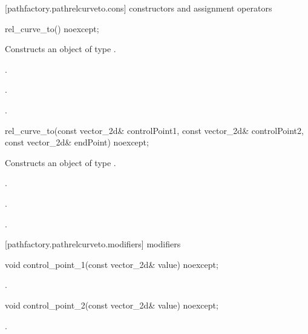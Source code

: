  [pathfactory.pathrelcurveto.cons] { constructors and assignment operators}

\begin{itemdecl}
    rel_curve_to() noexcept;
\end{itemdecl}
\begin{itemdescr}
	\pnum
	\effects
	Constructs an object of type .
	
	\pnum
	\postconditions
	.

	.

	.
\end{itemdescr}

\begin{itemdecl}
    rel_curve_to(const vector_2d& controlPoint1, const vector_2d& controlPoint2,
      const vector_2d& endPoint) noexcept;
\end{itemdecl}
\begin{itemdescr}
	\pnum
	\effects
	Constructs an object of type .
	
	\pnum
	\postconditions
	.

	.

	.
\end{itemdescr}

 [pathfactory.pathrelcurveto.modifiers]{ modifiers}

\begin{itemdecl}
    void control_point_1(const vector_2d& value) noexcept;
\end{itemdecl}
\begin{itemdescr}
	\pnum
	\postconditions
	.
\end{itemdescr}

\begin{itemdecl}
    void control_point_2(const vector_2d& value) noexcept;
\end{itemdecl}
\begin{itemdescr}
	\pnum
	\postconditions
	.
\end{itemdescr}

